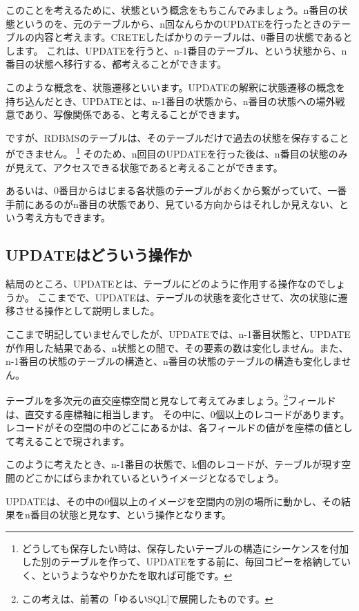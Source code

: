 このことを考えるために、状態という概念をもちこんでみましょう。n番目の状態というのを、元のテーブルから、n回なんらかのUPDATEを行ったときのテーブルの内容と考えます。CRETEしたばかりのテーブルは、0番目の状態であるとします。
これは、UPDATEを行うと、n-1番目のテーブル、という状態から、n番目の状態へ移行する、都考えることができます。

このような概念を、状態遷移といいます。UPDATEの解釈に状態遷移の概念を持ち込んだとき、UPDATEとは、n-1番目の状態から、n番目の状態への場外戦意であり、写像関係である、と考えることができます。

ですが、RDBMSのテーブルは、そのテーブルだけで過去の状態を保存することができません。
\footnote{どうしても保存したい時は、保存したいテーブルの構造にシーケンスを付加した別のテーブルを作って、UPDATEをする前に、毎回コピーを格納していく、というようなやりかたを取れば可能です。}
そのため、n回目のUPDATEを行った後は、n番目の状態のみが見えて、アクセスできる状態であると考えることができます。

あるいは、0番目からはじまる各状態のテーブルがおくから繋がっていて、一番手前にあるのがn番目の状態であり、見ている方向からはそれしか見えない、という考え方もできます。

\subsection{UPDATEはどういう操作か}

結局のところ、UPDATEとは、テーブルにどのように作用する操作なのでしょうか。
ここまでで、UPDATEは、テーブルの状態を変化させて、次の状態に遷移させる操作として説明しました。

ここまで明記していませんでしたが、UPDATEでは、n-1番目状態と、UPDATEが作用した結果である、n状態との間で、その要素の数は変化しません。また、n-1番目の状態のテーブルの構造と、n番目の状態のテーブルの構造も変化しません。

テーブルを多次元の直交座標空間と見なして考えてみましょう。\footnote{この考えは、前著の「ゆるいSQL]で展開したものです。}フィールドは、直交する座標軸に相当します。
その中に、0個以上のレコードがあります。レコードがその空間の中のどこにあるかは、各フィールドの値がを座標の値として考えることで現されます。

このように考えたとき、n-1番目の状態で、k個のレコードが、テーブルが現す空間のどこかにばらまかれているというイメージとなるでしょう。

UPDATEは、その中の0個以上のイメージを空間内の別の場所に動かし、その結果をn番目の状態と見なす、という操作となります。

